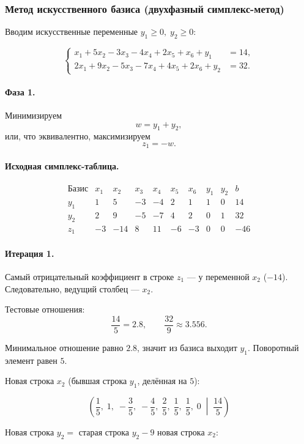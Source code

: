 \documentclass[a4paper,14pt]{extarticle}
\begin{document}
\subsubsection*{Метод искусственного базиса (двухфазный симплекс-метод)}

Вводим искусственные переменные \(y_1\ge0,\; y_2\ge0\):

\[
\left\{
\begin{aligned}
x_1+5x_2-3x_3-4x_4+2x_5+x_6+y_1&=14,\\
2x_1+9x_2-5x_3-7x_4+4x_5+2x_6+y_2&=32.
\end{aligned}
\right.
\]

\paragraph{Фаза 1.}
Минимизируем
\[
w=y_1+y_2,
\]
или, что эквивалентно, максимизируем
\[
z_1=-w.
\]

\paragraph{Исходная симплекс-таблица.}

\[
\begin{array}{c|rrrrrrrr|r}
\text{Базис} & x_1 & x_2 & x_3 & x_4 & x_5 & x_6 & y_1 & y_2 & b\\
\hline
y_1 & 1 & 5 & -3 & -4 & 2 & 1 & 1 & 0 & 14\\
y_2 & 2 & 9 & -5 & -7 & 4 & 2 & 0 & 1 & 32\\
z_1 & -3 & -14 & 8 & 11 & -6 & -3 & 0 & 0 & -46
\end{array}
\]

\paragraph{Итерация 1.}
Самый отрицательный коэффициент в строке \(z_1\) — у переменной \(x_2\) (\(-14\)). Следовательно, ведущий столбец — \(x_2\).

Тестовые отношения:
\[
\frac{14}{5}=2.8,\qquad \frac{32}{9}\approx3.556.
\]

Минимальное отношение равно \(2.8\), значит из базиса выходит \(y_1\). Поворотный элемент равен \(5\).

Новая строка \(x_2\) (бывшая строка \(y_1\), делённая на \(5\)):

\[
\left(
\frac15,\;1,\;-\frac35,\;-\frac45,\;\frac25,\;\frac15,\;\frac15,\;0
\;\middle|\;
\frac{14}{5}
\right)
\]

Новая строка \(y_2 =\) старая строка \(y_2 - 9\) новая строка \(x_2\):
\end{document}
